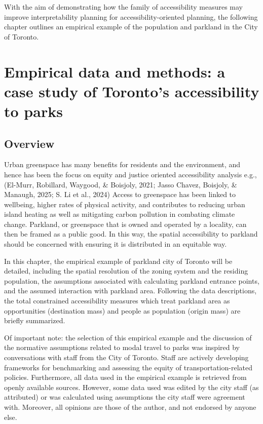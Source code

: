 \documentclass[
11pt, %
oneside, %
english, %
singlespacing, %
]{macthesis} %
\begin{document}
With the aim of demonstrating how the family of accessibility measures may improve interpretability planning for accessibility-oriented planning, the following chapter outlines an empirical example of the population and parkland in the City of Toronto.

\chapter{Empirical data and methods: a case study of Toronto's accessibility to parks}\label{empirical-data-and-methods-a-case-study-of-torontos-accessibility-to-parks}

\section{Overview}\label{overview-3}

Urban greenspace has many benefits for residents and the environment, and hence has been the focus on equity and justice oriented accessibility analysis e.g., (El-Murr, Robillard, Waygood, \& Boisjoly, 2021; Jasso Chavez, Boisjoly, \& Manaugh, 2025; S. Li et al., 2024) Access to greenspace has been linked to wellbeing, higher rates of physical activity, and contributes to reducing urban island heating as well as mitigating carbon pollution in combating climate change. Parkland, or greenspace that is owned and operated by a locality, can then be framed as a public good. In this way, the spatial accessibility to parkland should be concerned with ensuring it is distributed in an equitable way.

In this chapter, the empirical example of parkland city of Toronto will be detailed, including the spatial resolution of the zoning system and the residing population, the assumptions associated with calculating parkland entrance points, and the assumed interaction with parkland area. Following the data descriptions, the total constrained accessibility measures which treat parkland area as opportunities (destination mass) and people as population (origin mass) are briefly summarized.

Of important note: the selection of this empirical example and the discussion of the normative assumptions related to modal travel to parks was inspired by conversations with staff from the City of Toronto. Staff are actively developing frameworks for benchmarking and assessing the equity of transportation-related policies. Furthermore, all data used in the empirical example is retrieved from openly available sources. However, some data used was edited by the city staff (as attributed) or was calculated using assumptions the city staff were agreement with. Moreover, all opinions are those of the author, and not endorsed by anyone else.
\end{document}
